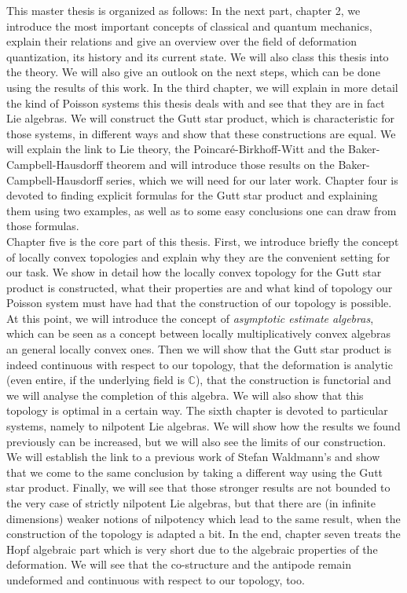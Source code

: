 This master thesis is organized as follows: In the next part, chapter 2, we 
introduce the most important concepts of classical and quantum mechanics, 
explain their relations and give an overview over the field of deformation 
quantization, its history and its current state. We will also class this thesis 
into the theory. We will also give an outlook on the next steps, which can be 
done using the results of this work.
In the third chapter, we will explain in more detail the kind of Poisson 
systems this thesis deals with and see that they are in fact Lie algebras. We 
will construct the Gutt star product, which is characteristic for those 
systems, in different ways and show that these constructions are equal. We will 
explain the link to Lie theory, the Poincar\'e-Birkhoff-Witt and the 
Baker-Campbell-Hausdorff theorem and will introduce those results on the 
Baker-Campbell-Hausdorff series, which we will need for our later work.
Chapter four is devoted to finding explicit formulas for the Gutt star product 
and explaining them using two examples, as well as to some easy conclusions one 
can draw from those formulas.\\
Chapter five is the core part of this thesis. First, we introduce briefly the 
concept of locally convex topologies and explain why they are the convenient 
setting for our task. We show in detail how the locally convex topology for the 
Gutt star product is constructed, what their properties are and what kind of 
topology our Poisson system must have had that the construction of our 
topology is possible. At this point, we will introduce the concept of 
\emph{asymptotic estimate algebras}, 
which can be seen as a concept between locally multiplicatively convex algebras 
an general locally convex ones. Then we will show that the Gutt star product is 
indeed continuous with respect to our topology, that the deformation is 
analytic (even entire, if the underlying field is $\mathbb{C}$), that the 
construction is functorial and we will analyse the completion of this algebra. 
We will also show that this topology is optimal in a certain way.
The sixth chapter is devoted to particular systems, namely to nilpotent Lie 
algebras. We will show how the results we found previously can be increased, 
but we will also see the limits of our construction. We will establish 
the link to a previous work of Stefan Waldmann's and show that we come to the 
same conclusion by taking a different way using the Gutt star product. Finally, 
we will see that those stronger results are not bounded to the very case of 
strictly nilpotent Lie algebras, but that there are (in infinite dimensions) 
weaker notions of nilpotency which lead to the same result, when the 
construction of the topology is adapted a bit.
In the end, chapter seven treats the Hopf algebraic part which is very short 
due to the algebraic properties of the deformation. We will see that 
the co-structure and the antipode remain undeformed and continuous with respect 
to our topology, too.


